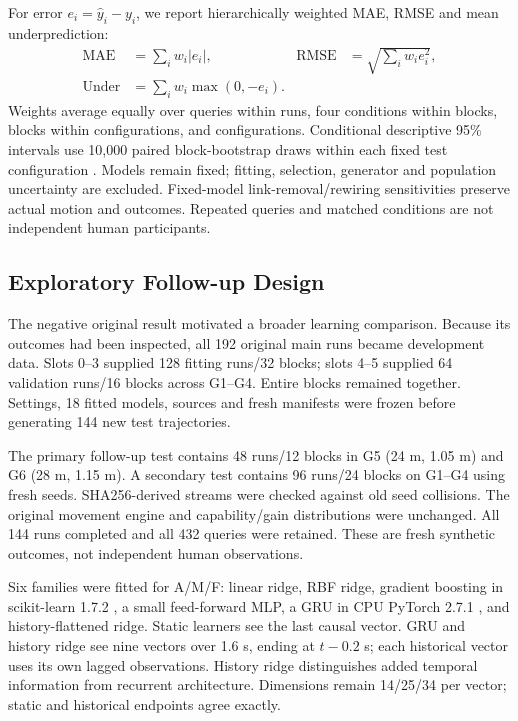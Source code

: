 \documentclass[conference]{IEEEtran}
\newcommand{\MAE}{\operatorname{MAE}}
\begin{document}
For error $e_i=\hat y_i-y_i$, we report hierarchically weighted MAE, RMSE and mean underprediction:
\begin{align}
\MAE&=\sum_iw_i|e_i|, &
\operatorname{RMSE}&=\sqrt{\sum_iw_ie_i^2},\\
\operatorname{Under}&=\sum_iw_i\max(0,-e_i).
\end{align}
Weights average equally over queries within runs, four conditions within blocks, blocks within configurations, and configurations. Conditional descriptive 95\% intervals use 10,000 paired block-bootstrap draws within each fixed test configuration \cite{r6}. Models remain fixed; fitting, selection, generator and population uncertainty are excluded. Fixed-model link-removal/rewiring sensitivities preserve actual motion and outcomes. Repeated queries and matched conditions are not independent human participants.


\subsection{Exploratory Follow-up Design}
The negative original result motivated a broader learning comparison. Because its outcomes had been inspected, all 192 original main runs became development data. Slots 0--3 supplied 128 fitting runs/32 blocks; slots 4--5 supplied 64 validation runs/16 blocks across G1--G4. Entire blocks remained together. Settings, 18 fitted models, sources and fresh manifests were frozen before generating 144 new test trajectories.

The primary follow-up test contains 48 runs/12 blocks in G5 (24 m, 1.05 m) and G6 (28 m, 1.15 m). A secondary test contains 96 runs/24 blocks on G1--G4 using fresh seeds. SHA256-derived streams were checked against old seed collisions. The original movement engine and capability/gain distributions were unchanged. All 144 runs completed and all 432 queries were retained. These are fresh synthetic outcomes, not independent human observations.

Six families were fitted for A/M/F: linear ridge, RBF ridge, gradient boosting in scikit-learn 1.7.2 \cite{SKLEARN}, a small feed-forward MLP, a GRU in CPU PyTorch 2.7.1 \cite{TORCH}, and history-flattened ridge. Static learners see the last causal vector. GRU and history ridge see nine vectors over 1.6 s, ending at $t-0.2$ s; each historical vector uses its own lagged observations. History ridge distinguishes added temporal information from recurrent architecture. Dimensions remain 14/25/34 per vector; static and historical endpoints agree exactly.
\end{document}
